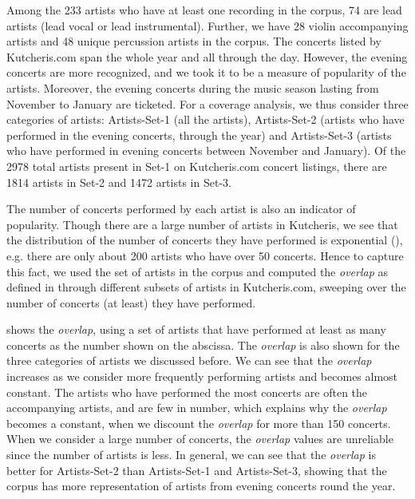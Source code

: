 Among the 233 artists who have at least one recording in the corpus, 74 are lead artists (lead vocal or lead instrumental). Further, we have 28 violin accompanying artists and 48 unique percussion artists in the corpus. The concerts listed by Kutcheris.com span the whole year and all through the day. However, the evening concerts are more recognized, and we took it to be a measure of popularity of the artists. Moreover, the evening concerts during the music season lasting from November to January are ticketed. For a coverage analysis, we thus consider three categories of artists: Artists-Set-1 (all the artists), Artists-Set-2 (artists who have performed in the evening concerts, through the year) and Artists-Set-3 (artists who have performed in evening concerts between November and January). Of the 2978 total artists present in Set-1 on Kutcheris.com concert listings, there are 1814 artists in Set-2 and 1472 artists in Set-3.

The number of concerts performed by each artist is also an indicator of popularity. Though there are a large number of artists in Kutcheris, we see that the distribution of the number of concerts they have performed is exponential (), e.g. there are only about 200 artists who have over 50 concerts. Hence to capture this fact, we used the set of artists in the corpus and computed the \textit{overlap} as defined in  through different subsets of artists in Kutcheris.com, sweeping over the number of concerts (at least) they have performed. 

 shows the \textit{overlap}, using a set of artists that have performed at least as many concerts as the number shown on the abscissa. The \textit{overlap} is also shown for the three categories of artists we discussed before. We can see that the \textit{overlap} increases as we consider more frequently performing artists and becomes almost constant. The artists who have performed the most concerts are often the accompanying artists, and are few in number, which explains why the \textit{overlap} becomes a constant, when we discount the \textit{overlap} for more than 150 concerts. When we consider a large number of concerts, the \textit{overlap} values are unreliable since the number of artists is less. In general, we can see that the \textit{overlap} is better for Artists-Set-2 than Artists-Set-1 and Artists-Set-3, showing that the corpus has more representation of artists from evening concerts round the year. 
% 
